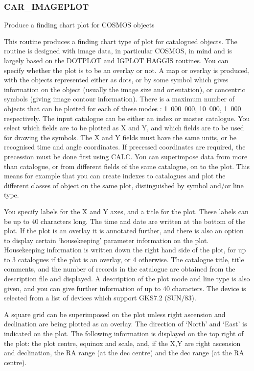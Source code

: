 \subsubsection{CAR\_IMAGEPLOT}

Produce a finding chart plot for COSMOS objects

This routine produces a finding chart type of plot for catalogued
objects.
The routine is designed with image data, in particular COSMOS, in mind
and is largely based on the DOTPLOT and IGPLOT HAGGIS routines.
You can specify whether the plot is to be an overlay or not.
A map or overlay is produced, with the objects represented either as
dots, or by some symbol which gives information on the object (usually
the image size and orientation), or concentric symbols (giving image
contour information).
There is a maximum number of objects that can be plotted for each of
these modes : 1~000~000, 10~000, 1~000 respectively.
The input catalogue can be either an index or master catalogue.
You select which fields are to be plotted as X and Y, and which
fields are to be used for drawing the symbols.
The X and Y fields must have the same units, or be recognised time and
angle coordinates.
If precessed coordinates are required, the precession must be done first
using CALC.
You can superimpose data from more than catalogue, or from
different fields of the same catalogue, on to the plot.
This means for example that you can create indexes to catalogues
and plot the different classes of object on the same plot, distinguished
by symbol and/or line type.

You specify labels for the X and Y axes, and a title for the plot.
These labels can be up to 40 characters long.
The time and date are written at the bottom of the plot.
If the plot is an overlay it is annotated further, and there is also an
option to display certain `housekeeping' parameter information on the plot.
Housekeeping information is written down the right hand side of the
plot, for up to 3 catalogues if the plot is an overlay, or 4 otherwise.
The catalogue title, title comments, and the number of records in the
catalogue are obtained from the description file and displayed.
A description of the plot mode and line type is also given, and you
can give further information of up to 40 characters.
The device is selected from a list of devices which support GKS7.2 (SUN/83).

A square grid can be superimposed on the plot unless right ascension
and declination are being plotted as an overlay.
The direction of `North' and `East' is indicated on the plot.
The following information is displayed on the top right of the plot: the
plot centre, equinox and scale, and, if the X,Y are right ascension
and declination, the RA range (at the dec centre) and the dec range
(at the RA centre).

